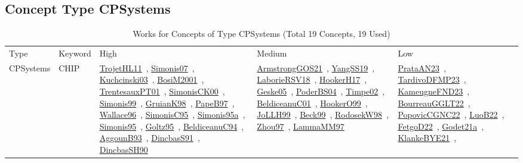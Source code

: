 \clearpage
\subsection{Concept Type CPSystems}
\label{sec:CPSystems}
\label{CPSystems}
{\scriptsize
\begin{longtable}{lp{3cm}>{\raggedright\arraybackslash}p{6cm}>{\raggedright\arraybackslash}p{6cm}>{\raggedright\arraybackslash}p{8cm}}
\rowcolor{white}\caption{Works for Concepts of Type CPSystems (Total 19 Concepts, 19 Used)}\\ \toprule
\rowcolor{white}Type & Keyword & High & Medium & Low\\ \midrule\endhead
\bottomrule
\endfoot
\index{CHIP}\index{CPSystems!CHIP}CPSystems & CHIP & \href{../works/TrojetHL11.pdf}{TrojetHL11}~\cite{TrojetHL11}, \href{../works/Simonis07.pdf}{Simonis07}~\cite{Simonis07}, \href{../works/Kuchcinski03.pdf}{Kuchcinski03}~\cite{Kuchcinski03}, \href{../works/BosiM2001.pdf}{BosiM2001}~\cite{BosiM2001}, \href{../works/TrentesauxPT01.pdf}{TrentesauxPT01}~\cite{TrentesauxPT01}, \href{../works/SimonisCK00.pdf}{SimonisCK00}~\cite{SimonisCK00}, \href{../works/Simonis99.pdf}{Simonis99}~\cite{Simonis99}, \href{../works/GruianK98.pdf}{GruianK98}~\cite{GruianK98}, \href{../works/PapeB97.pdf}{PapeB97}~\cite{PapeB97}, \href{../works/Wallace96.pdf}{Wallace96}~\cite{Wallace96}, \href{../works/SimonisC95.pdf}{SimonisC95}~\cite{SimonisC95}, \href{../works/Simonis95a.pdf}{Simonis95a}~\cite{Simonis95a}, \href{../works/Simonis95.pdf}{Simonis95}~\cite{Simonis95}, \href{../works/Goltz95.pdf}{Goltz95}~\cite{Goltz95}, \href{../works/BeldiceanuC94.pdf}{BeldiceanuC94}~\cite{BeldiceanuC94}, \href{../works/AggounB93.pdf}{AggounB93}~\cite{AggounB93}, \href{../works/DincbasS91.pdf}{DincbasS91}~\cite{DincbasS91}, \href{../works/DincbasSH90.pdf}{DincbasSH90}~\cite{DincbasSH90} & \href{../works/ArmstrongGOS21.pdf}{ArmstrongGOS21}~\cite{ArmstrongGOS21}, \href{../works/YangSS19.pdf}{YangSS19}~\cite{YangSS19}, \href{../works/LaborieRSV18.pdf}{LaborieRSV18}~\cite{LaborieRSV18}, \href{../works/HookerH17.pdf}{HookerH17}~\cite{HookerH17}, \href{../works/Geske05.pdf}{Geske05}~\cite{Geske05}, \href{../works/PoderBS04.pdf}{PoderBS04}~\cite{PoderBS04}, \href{../works/Timpe02.pdf}{Timpe02}~\cite{Timpe02}, \href{../works/BeldiceanuC01.pdf}{BeldiceanuC01}~\cite{BeldiceanuC01}, \href{../works/HookerO99.pdf}{HookerO99}~\cite{HookerO99}, \href{../works/JoLLH99.pdf}{JoLLH99}~\cite{JoLLH99}, \href{../works/Beck99.pdf}{Beck99}~\cite{Beck99}, \href{../works/RodosekW98.pdf}{RodosekW98}~\cite{RodosekW98}, \href{../works/Zhou97.pdf}{Zhou97}~\cite{Zhou97}, \href{../works/LammaMM97.pdf}{LammaMM97}~\cite{LammaMM97} & \href{../works/PrataAN23.pdf}{PrataAN23}~\cite{PrataAN23}, \href{../works/TardivoDFMP23.pdf}{TardivoDFMP23}~\cite{TardivoDFMP23}, \href{../works/KameugneFND23.pdf}{KameugneFND23}~\cite{KameugneFND23}, \href{../works/BourreauGGLT22.pdf}{BourreauGGLT22}~\cite{BourreauGGLT22}, \href{../works/PopovicCGNC22.pdf}{PopovicCGNC22}~\cite{PopovicCGNC22}, \href{../works/LuoB22.pdf}{LuoB22}~\cite{LuoB22}, \href{../works/FetgoD22.pdf}{FetgoD22}~\cite{FetgoD22}, \href{../works/Godet21a.pdf}{Godet21a}~\cite{Godet21a}, \href{../works/KlankeBYE21.pdf}{KlankeBYE21}~\cite{KlankeBYE21}, 
\end{longtable}}

